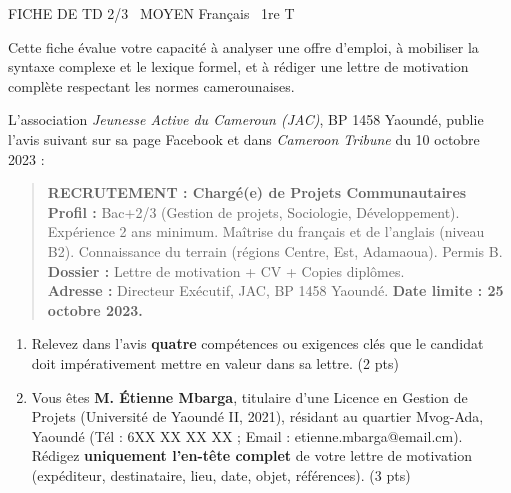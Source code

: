 \documentclass[11pt]{article}
\begin{document}
\begin{tcolorbox}[enhanced,colback=popink,colframe=popink,arc=10pt,boxrule=0pt,left=12pt,right=12pt,top=9pt,bottom=9pt]
{\color{white}\popxbold\small FICHE DE TD 2/3 \textbullet\ MOYEN \hfill Français \textbullet\ 1re T\par}
\end{tcolorbox}
\vspace{4pt}

\noindent Cette fiche évalue votre capacité à analyser une offre d'emploi, à mobiliser la syntaxe complexe et le lexique formel, et à rédiger une lettre de motivation complète respectant les normes camerounaises.

\begin{exercice}
L'association \textit{Jeunesse Active du Cameroun (JAC)}, BP 1458 Yaoundé, publie l'avis suivant sur sa page Facebook et dans \textit{Cameroon Tribune} du 10 octobre 2023 :

\begin{quote}
\textbf{RECRUTEMENT : Chargé(e) de Projets Communautaires}\\
\textbf{Profil :} Bac+2/3 (Gestion de projets, Sociologie, Développement). Expérience 2 ans minimum. Maîtrise du français et de l'anglais (niveau B2). Connaissance du terrain (régions Centre, Est, Adamaoua). Permis B.\\
\textbf{Dossier :} Lettre de motivation + CV + Copies diplômes.\\
\textbf{Adresse :} Directeur Exécutif, JAC, BP 1458 Yaoundé. \textbf{Date limite : 25 octobre 2023.}
\end{quote}

\begin{enumerate}
    \item Relevez dans l'avis \textbf{quatre} compétences ou exigences clés que le candidat doit impérativement mettre en valeur dans sa lettre. \hfill (2 pts)
    \item Vous êtes \textbf{M. Étienne Mbarga}, titulaire d'une Licence en Gestion de Projets (Université de Yaoundé II, 2021), résidant au quartier Mvog-Ada, Yaoundé (Tél : 6XX XX XX XX ; Email : etienne.mbarga@email.cm). Rédigez \textbf{uniquement l'en-tête complet} de votre lettre de motivation (expéditeur, destinataire, lieu, date, objet, références). \hfill (3 pts)
\end{enumerate}
\end{exercice}
\end{document}
